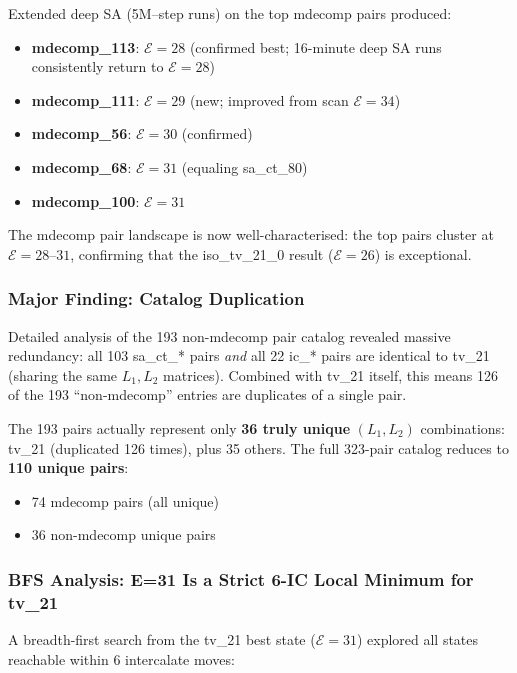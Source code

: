 \documentclass[11pt,a4paper]{article}
\theoremstyle{remark}
\newcommand{\E}{\mathcal{E}}
\begin{document}
Extended deep SA (5M--step runs) on the top mdecomp pairs produced:
\begin{itemize}[noitemsep]
  \item \textbf{mdecomp\_113}: $\E=28$ (confirmed best; 16-minute deep SA runs consistently return to $\E=28$)
  \item \textbf{mdecomp\_111}: $\E=29$ (new; improved from scan $\E=34$)
  \item \textbf{mdecomp\_56}: $\E=30$ (confirmed)
  \item \textbf{mdecomp\_68}: $\E=31$ (equaling sa\_ct\_80)
  \item \textbf{mdecomp\_100}: $\E=31$
\end{itemize}

The mdecomp pair landscape is now well-characterised: the top pairs cluster at
$\E=28$--$31$, confirming that the iso\_tv\_21\_0 result ($\E=26$) is exceptional.

\subsubsection{Major Finding: Catalog Duplication}

Detailed analysis of the 193 non-mdecomp pair catalog revealed massive redundancy:
all 103 sa\_ct\_* pairs \emph{and} all 22 ic\_* pairs are identical to tv\_21
(sharing the same $L_1, L_2$ matrices). Combined with tv\_21 itself, this means
126 of the 193 ``non-mdecomp'' entries are duplicates of a single pair.

The 193 pairs actually represent only \textbf{36 truly unique} $(L_1, L_2)$ combinations:
tv\_21 (duplicated 126 times), plus 35 others. The full 323-pair catalog reduces to
\textbf{110 unique pairs}:
\begin{itemize}[noitemsep]
  \item 74 mdecomp pairs (all unique)
  \item 36 non-mdecomp unique pairs
\end{itemize}

\subsubsection{BFS Analysis: E=31 Is a Strict 6-IC Local Minimum for tv\_21}

A breadth-first search from the tv\_21 best state ($\E=31$) explored all states
reachable within 6 intercalate moves:
\end{document}
